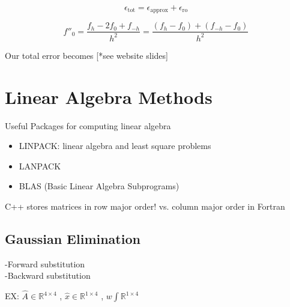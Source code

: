 \documentclass[10pt]{article} %
\begin{document}
\[ \epsilon_{\text{tot}} = \epsilon_{\text{approx}}+\epsilon_{\text{ro}} \]

\[ f''_0=\dfrac{f_h-2f_0+f_{-h}}{h^2} = \dfrac{(f_h-f_0)+(f_{-h}-f_0)}{h^2} \]

Our total error becomes [*see website slides]

\section{Linear Algebra Methods}

Useful Packages for computing linear algebra

\begin{itemize}
\item LINPACK: linear algebra and least square problems
\item LANPACK
\item BLAS (Basic Linear Algebra Subprograms)
\end{itemize}

C++  stores matrices in row major order! vs. column major order in Fortran

\subsection{Gaussian Elimination}

-Forward substitution \\ -Backward substitution

EX: $ \hat{A} \in \mathbb{R}^{4\times 4} $ , $\hat{x} \in \mathbb{R}^{1\times 4}$ , $w \int \mathbb{R}^{1\times 4}$
\end{document}

